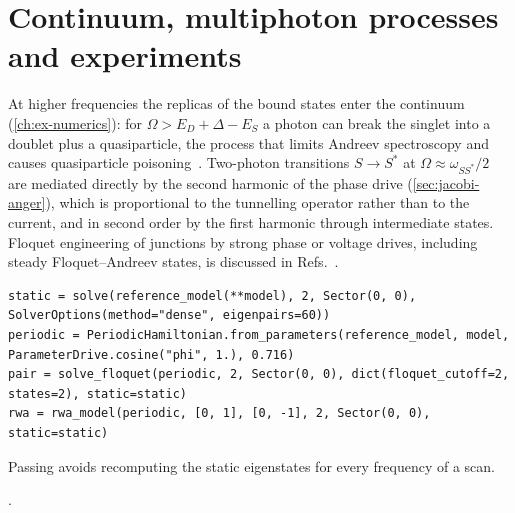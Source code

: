 \section{Continuum, multiphoton processes and experiments}

At higher frequencies the replicas of the bound states enter the continuum
(\cref{ch:ex-numerics}): for $\Omega>E_D+\Delta-E_S$ a photon can break the singlet into a
doublet plus a quasiparticle, the process that limits Andreev spectroscopy and causes
quasiparticle poisoning~\cite{zgirski2011evidence,olivares2014dynamics,riwar2015control,wesdorp2023dynamical}.
Two-photon transitions $S\to S^*$ at $\Omega\approx\omega_{SS^*}/2$ are mediated directly by the
second harmonic of the phase drive (\cref{sec:jacobi-anger}), which is proportional to the
tunnelling operator rather than to the current, and in second order by the first harmonic
through intermediate states. Floquet engineering of junctions by strong
phase or voltage drives, including steady Floquet--Andreev states, is discussed in
Refs.~\cite{peraltagavensky2018berry,venitucci2018nonadiabatic,melin2019engineering,keliri2023driven,park2022steady,ortegataberner2023anomalous}.

\begin{incode}
\begin{lstlisting}[frame=none,backgroundcolor={},aboveskip=0pt,belowskip=0pt]
static = solve(reference_model(**model), 2, Sector(0, 0), SolverOptions(method="dense", eigenpairs=60))
periodic = PeriodicHamiltonian.from_parameters(reference_model, model, ParameterDrive.cosine("phi", 1.), 0.716)
pair = solve_floquet(periodic, 2, Sector(0, 0), dict(floquet_cutoff=2, states=2), static=static)
rwa = rwa_model(periodic, [0, 1], [0, -1], 2, Sector(0, 0), static=static)
\end{lstlisting}
Passing  avoids recomputing the static eigenstates for every frequency of a scan.
\par\smallskip{}.
\end{incode}

